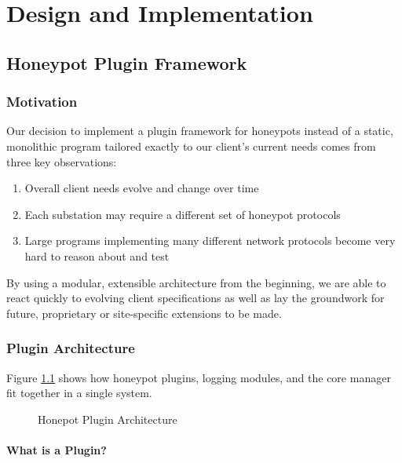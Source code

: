 \chapter{Design and Implementation}

\section{Honeypot Plugin Framework}

\subsection{Motivation}

Our decision to implement a plugin framework for honeypots instead of a
static, monolithic program tailored exactly to our client's current needs
comes from three key observations:

\begin{enumerate}
    \item Overall client needs evolve and change over time
    \item Each substation may require a different set of honeypot protocols
    \item Large programs implementing many different network protocols become
    very hard to reason about and test
\end{enumerate}

By using a modular, extensible architecture from the beginning, we are able
to react quickly to evolving client specifications as well as lay the groundwork
for future, proprietary or site-specific extensions to be made.

\subsection{Plugin Architecture}

Figure \ref{fig:hpot-arch} shows how honeypot plugins, logging modules, and
the core manager fit together in a single system.

\begin{center}
\begin{figure}
{
\scalebox{0.7}{}
}
\label{fig:hpot-arch}
\caption{Honepot Plugin Architecture}
\end{figure}
\end{center}

\subsubsection{What is a Plugin?}

